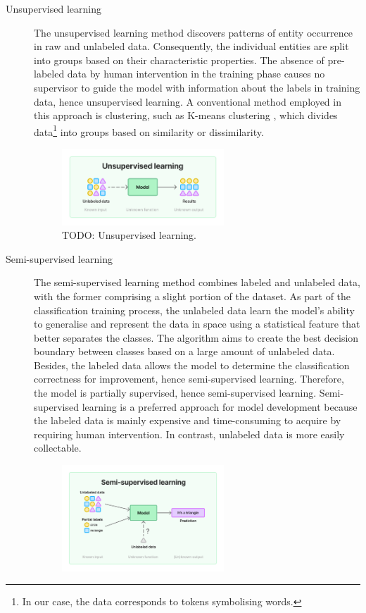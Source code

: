 \begin{description}
    \item[Unsupervised learning] The unsupervised learning method discovers patterns of entity occurrence in raw and unlabeled data. Consequently, the individual entities are split into groups based on their characteristic properties. The absence of pre-labeled data by human intervention in the training phase causes no supervisor to guide the model with information about the labels in training data, hence unsupervised learning. A conventional method employed in this approach is clustering, such as K-means clustering \parencite{9072123kmeans}, which divides data\footnote{In our case, the data corresponds to tokens symbolising words.} into groups based on similarity or dissimilarity.
    \begin{figure}[H]
        \centering
        \includegraphics[width=0.6\textwidth]{img/unsupervised.pdf}
        \caption{TODO: Unsupervised learning.}
        \label{fig:unsupervised-learning}
    \end{figure}
    \item[Semi-supervised learning] The semi-supervised learning method combines labeled and unlabeled data, with the former comprising a slight portion of the dataset. As part of the classification training process, the unlabeled data learn the model's ability to generalise and represent the data in space using a statistical feature that better separates the classes. The algorithm aims to create the best decision boundary between classes based on a large amount of unlabeled data. Besides, the labeled data allows the model to determine the classification correctness for improvement, hence semi-supervised learning. Therefore, the model is partially supervised, hence semi-supervised learning. Semi-supervised learning is a preferred approach for model development because the labeled data is mainly expensive and time-consuming to acquire by requiring human intervention. In contrast, unlabeled data is more easily collectable.
    \begin{figure}[H]
        \centering
        \includegraphics[width=0.6\textwidth]{img/semi-supervised.pdf}

\end{figure}
\end{description}
